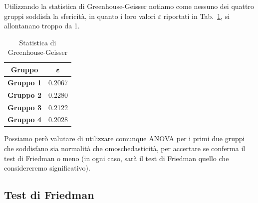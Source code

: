 \documentclass[conference]{IEEEtran}
\begin{document}
Utilizzando la statistica di Greenhouse-Geisser notiamo come nessuno dei quattro gruppi
soddisfa la sfericità, in quanto i loro valori $\varepsilon$ riportati in Tab.~\ref{tab4},
si allontanano troppo da 1.
\begin{table}[htbp]
    \caption{Statistica di Greenhouse-Geisser}
    \begin{center}
    \begin{tabular}{|c|c|}
    \hline
    \textbf{Gruppo} & $\boldsymbol{\varepsilon}$\\
    \hline
    \textbf{Gruppo 1} & 0.2067 \\\cline{1-2}
    \textbf{Gruppo 2} & 0.2280 \\\cline{1-2}
    \textbf{Gruppo 3} & 0.2122 \\\cline{1-2}
    \textbf{Gruppo 4} & 0.2028 \\\cline{1-2}
    \hline
    \end{tabular}
    \label{tab4}
    \end{center}
\end{table}
Possiamo però valutare di utilizzare comunque ANOVA per i primi due gruppi
che soddisfano sia normalità che omoschedasticità, per
accertare se conferma il test di Friedman o meno (in ogni caso, sarà il test di Friedman
quello che considereremo significativo).

\subsection{Test di Friedman}
\end{document}
